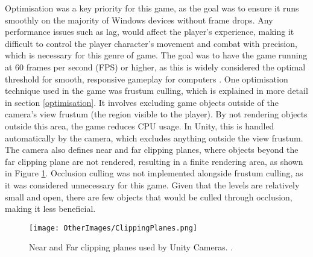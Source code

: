 \documentclass[10pt]{final_report}
\begin{document}
Optimisation was a key priority for this game, as the goal was to ensure it runs smoothly on the majority of Windows devices without frame drops. Any performance issues such as lag, would affect the player’s experience, making it difficult to control the player character's movement and combat with precision, which is necessary for this genre of game. The goal was to have the game running at 60 frames per second (FPS) or higher, as this is widely considered the optimal threshold for smooth, responsive gameplay for computers \cite{Samuel2025}. 
\newline
One optimisation technique used in the game was frustum culling, which is explained in more detail in section \ref{optimisation}. It involves excluding game objects outside of the camera's view frustum (the region visible to the player). By not rendering objects outside this area, the game reduces CPU usage. In Unity, this is handled automatically by the camera, which excludes anything outside the view frustum. The camera also defines near and far clipping planes, where objects beyond the far clipping plane are not rendered, resulting in  a finite rendering area, as shown in Figure \ref{cullingarea}. Occlusion culling was not implemented alongside frustum culling, as it was considered unnecessary for this game. Given that the levels are relatively small and open, there are few objects that would be culled through occlusion, making it less beneficial.

\begin{figure}[H]
    \centering
    \texttt{[image: OtherImages/ClippingPlanes.png]}
    \caption{Near and Far clipping planes used by Unity Cameras. \cite{UnityFrustum}.}
    \label{cullingarea}
\end{figure}
\end{document}
